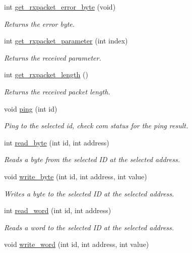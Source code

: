 \begin{DoxyCompactItemize}
int \hyperlink{a00003_a6e62341ef9f51b6e152e769bd7be9d75}{get\+\_\+rxpacket\+\_\+error\+\_\+byte} (void)
\begin{DoxyCompactList}\small\item\em Returns the error byte. \end{DoxyCompactList}\item 
int \hyperlink{a00003_a68b5fa99719a9aec0734ecfb0635503b}{get\+\_\+rxpacket\+\_\+parameter} (int index)
\begin{DoxyCompactList}\small\item\em Returns the received parameter. \end{DoxyCompactList}\item 
int \hyperlink{a00003_ae9cc18fdeda8329f68fa0f2f0a7a9aba}{get\+\_\+rxpacket\+\_\+length} ()
\begin{DoxyCompactList}\small\item\em Returns the received packet length. \end{DoxyCompactList}\item 
void \hyperlink{a00003_af2bd714423e7c4fc089762805c0c71f3}{ping} (int id)
\begin{DoxyCompactList}\small\item\em Ping to the selected id, check com status for the ping result. \end{DoxyCompactList}\item 
int \hyperlink{a00003_a888404b41c4c4395a0b745c77ff2cea9}{read\+\_\+byte} (int id, int address)
\begin{DoxyCompactList}\small\item\em Reads a byte from the selected I\+D at the selected address. \end{DoxyCompactList}\item 
void \hyperlink{a00003_a66c1e32cc45dd46d329f1fc212e46a3d}{write\+\_\+byte} (int id, int address, int value)
\begin{DoxyCompactList}\small\item\em Writes a byte to the selected I\+D at the selected address. \end{DoxyCompactList}\item 
int \hyperlink{a00003_a45e99341e82c5114f6e829c9141bf96f}{read\+\_\+word} (int id, int address)
\begin{DoxyCompactList}\small\item\em Reads a word to the selected I\+D at the selected address. \end{DoxyCompactList}\item 
void \hyperlink{a00003_a925f62ce5e261e5ef4fe6dc46bdc7c63}{write\+\_\+word} (int id, int address, int value)

\end{DoxyCompactItemize}

